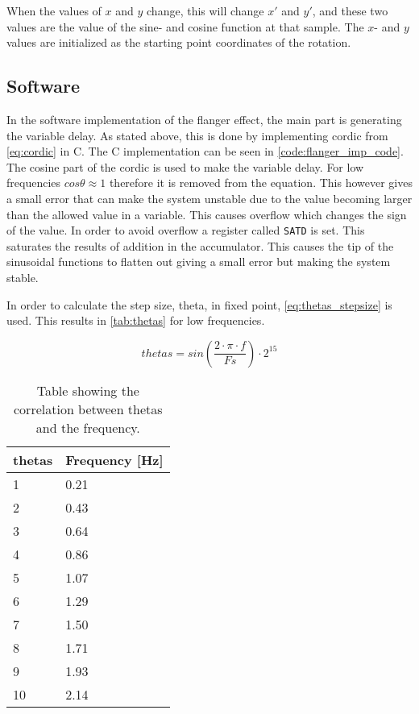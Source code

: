 When the values of $x$ and $y$ change, this will change $x'$ and $y'$, and these two values are the value of the sine- and cosine function at that sample. The $x$- and $y$ values are initialized as the starting point coordinates of the rotation. 

\subsection{Software}
In the software implementation of the flanger effect, the main part is generating the variable delay. As stated above, this is done by implementing \gls{cordic} from \autoref{eq:cordic} in C. The C implementation can be seen in \autoref{code:flanger_imp_code}. The cosine part of the \gls{cordic} is used to make the variable delay. For low frequencies $cos \theta \approx 1$ therefore it is removed from the equation. This however gives a small error that can make the system unstable due to the value becoming larger than the allowed value in a variable. This causes overflow which changes the sign of the value. In order to avoid overflow a register called \texttt{SATD} is set. This saturates the results of addition in the accumulator. This causes the tip of the sinusoidal functions to flatten out giving a small error but making the system stable. 

In order to calculate the step size, theta, in fixed point, \autoref{eq:thetas_stepsize} is used. This results in \autoref{tab:thetas} for low frequencies. 

\begin{equation}\label{eq:thetas_stepsize}
thetas= sin\left(\frac{2\cdot \pi \cdot f}{Fs}\right)\cdot 2^{15}
\end{equation}
\startexplain
\stopexplain


\begin{table}[H]
\centering
\caption{Table showing the correlation between thetas and the frequency.}
\label{tab:thetas}
\begin{tabular}{|l|l|}
\hline
thetas & Frequency {[}Hz{]} \\ \hline
1      & 0.21 \\ \hline
2      & 0.43 \\ \hline
3      & 0.64 \\ \hline
4      & 0.86 \\ \hline
5      & 1.07 \\ \hline
6      & 1.29 \\ \hline
7      & 1.50 \\ \hline
8      & 1.71 \\ \hline
9      & 1.93 \\ \hline
10     & 2.14 \\ \hline
\end{tabular}
\end{table}


